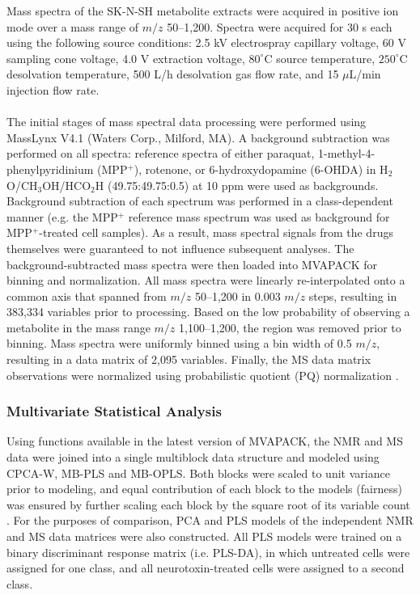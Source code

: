 \begin{doublespace}
Mass spectra of the SK-N-SH metabolite extracts were acquired in positive ion
mode over a mass range of $m/z$ 50--1,200. Spectra were acquired for 30 s each
using the following source conditions: 2.5 kV electrospray capillary voltage,
60 V sampling cone voltage, 4.0 V extraction voltage, $80^\circ$C source
temperature, $250^\circ$C desolvation temperature, 500 L/h desolvation gas
flow rate, and 15 $\mu$L/min injection flow rate.
\\\\
The initial stages of mass spectral data processing were performed using
MassLynx V4.1 (Waters Corp., Milford, MA). A background subtraction was
performed on all spectra: reference spectra of either paraquat,
1-methyl-4-phenylpyridinium (MPP$^+$), rotenone, or 6-hydroxydopamine (6-OHDA)
in H$_2$O/CH$_3$OH/HCO$_2$H (49.75:49.75:0.5) at 10 ppm were used as
backgrounds. Background subtraction of each spectrum was performed in a
class-dependent manner (e.g. the MPP$^+$ reference mass spectrum was used as
background for MPP$^+$-treated cell samples). As a result, mass spectral
signals from the drugs themselves were guaranteed to not influence subsequent
analyses. The background-subtracted mass spectra were then loaded into MVAPACK
for binning and normalization. All mass spectra were linearly re-interpolated
onto a common axis that spanned from $m/z$ 50--1,200 in 0.003 $m/z$ steps,
resulting in 383,334 variables prior to processing. Based on the low
probability of observing a metabolite in the mass range $m/z$ 1,100--1,200,
the region was removed prior to binning. Mass spectra were uniformly binned
using a bin width of 0.5 $m/z$, resulting in a data matrix of 2,095 variables.
Finally, the MS data matrix observations were normalized using probabilistic
quotient (PQ) normalization \cite{dieterle:anchem2006}.
\end{doublespace}

\subsubsection{Multivariate Statistical Analysis}

\begin{doublespace}
Using functions available in the latest version of MVAPACK, the NMR and MS
data were joined into a single multiblock data structure and modeled using
CPCA-W, MB-PLS and MB-OPLS. Both blocks were scaled to unit variance prior
to modeling, and equal contribution of each block to the models (fairness)
was ensured by further scaling each block by the square root of its variable
count \cite{smilde:jchemo2003}. For the purposes of comparison, PCA and PLS
models of the independent NMR and MS data matrices were also constructed.
All PLS models were trained on a binary discriminant response matrix
(i.e. PLS-DA), in which untreated cells were assigned for one class,
and all neurotoxin-treated cells were assigned to a second class.
\end{doublespace}

